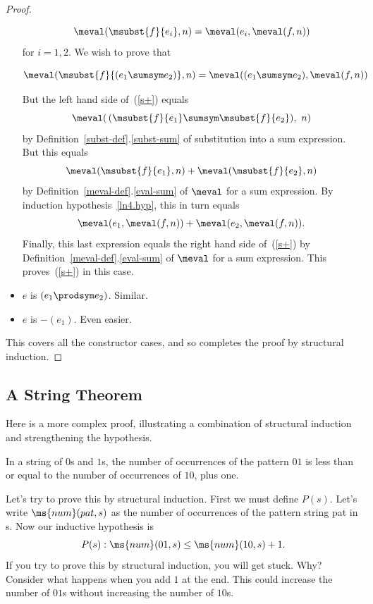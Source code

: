 \begin{definition}
\begin{proof}
\begin{itemize}
\begin{equation}\label{ln4.hyp}
\meval(\msubst{f}{e_i},n)  =  \meval(e_i, \meval(f,n))
\end{equation}
for $i= 1,2$.  We wish to prove that

\begin{equation}\label{s+}
\meval(\msubst{f}{(e_1\sumsym e_2)},n)  =  \meval((e_1 \sumsym e_2), \meval(f,n))
\end{equation}

But the left hand side of~(\ref{s+}) equals
\[
\meval(\, (\msubst{f}{e_1} \sumsym \msubst{f}{e_2}),\ n)
\]
by Definition~\ref{subst-def}.\ref{subst-sum} of substitution into a sum
expression.  But this equals
\[
\meval(\msubst{f}{e_1},n) + \meval(\msubst{f}{e_2},n)
\]
by Definition~\ref{meval-def}.\ref{eval-sum} of $\meval$ for a sum expression.  By
induction hypothesis~\eqref{ln4.hyp}, this in turn equals
\[
\meval(e_1,\meval(f,n)) + \meval(e_2,\meval(f,n)).
\]
Finally, this last expression equals the right hand side of~(\ref{s+}) by
Definition~\ref{meval-def}.\ref{eval-sum} of $\meval$ for a sum
expression.  This proves~(\ref{s+}) in this case.

\item $e$ is $(e_1 \prodsym e_2)$.  Similar.

\item $e$ is $-(e_1)$.  Even easier.

\end{itemize}

This covers all the constructor cases, and so completes the proof by
structural induction.

\end{proof}


\iffalse
\subsection{A String Theorem}

Here is a more complex proof, illustrating a combination of structural
induction and strengthening the hypothesis.

\begin{theorem}
  In a string of $0$s and $1$s, the number of occurrences of the pattern
  $01$ is less than or equal to the number of occurrences of $10$, plus
  one.
\end{theorem}

Let's try to prove this by structural induction.  First we must
define $P(s)$.  Let's write $\ms{num}(pat,s)$ as the number of
occurrences of the pattern string pat in s.  Now our inductive
hypothesis is
\[
P(s): \ms{num}(01,s) \leq \ms{num}(10,s) + 1. 
\]
If you try to prove this by structural induction, you will get
stuck.
Why? 
Consider what happens when you add $1$ at the end.  
This could increase the number of $01$s without increasing the number of
$10$s. 


\end{definition}
